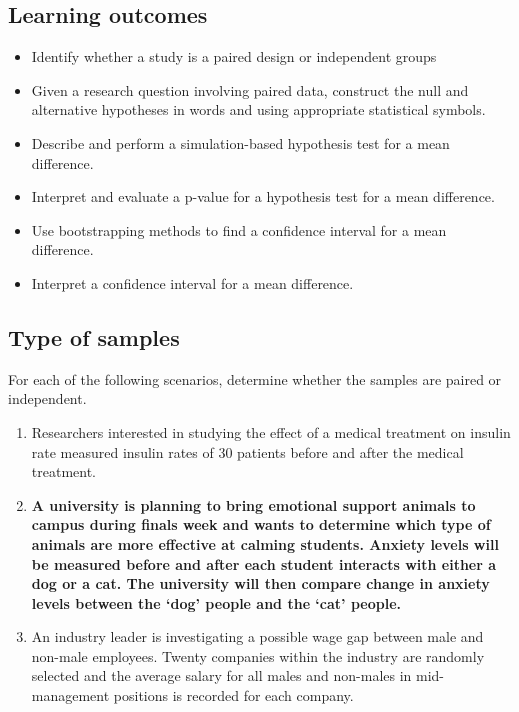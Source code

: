 \documentclass[
]{report}
\begin{document}

\hypertarget{learning-outcomes-5}{%
\subsection{Learning outcomes}\label{learning-outcomes-5}}

\begin{itemize}
\item
  Identify whether a study is a paired design or independent groups
\item
  Given a research question involving paired data, construct the null and alternative hypotheses
  in words and using appropriate statistical symbols.
\item
  Describe and perform a simulation-based hypothesis test for a mean difference.
\item
  Interpret and evaluate a p-value for a hypothesis test for a mean difference.
\item
  Use bootstrapping methods to find a confidence interval for a mean difference.
\item
  Interpret a confidence interval for a mean difference.
\end{itemize}

\hypertarget{type-of-samples}{%
\subsection{Type of samples}\label{type-of-samples}}

For each of the following scenarios, determine whether the samples are paired or independent.

\begin{enumerate}
\def\labelenumi{\arabic{enumi}.}
\item
  Researchers interested in studying the effect of a medical treatment on insulin rate measured insulin rates of 30 patients before and after the medical treatment.
  \vspace{0.3in}
\item
  \textbf{A university is planning to bring emotional support animals to campus during finals week and wants to determine which type of animals are more effective at calming students. Anxiety levels will be measured before and after each student interacts with either a dog or a cat. The university will then compare change in anxiety levels between the `dog' people and the `cat' people.}
  \vspace{0.3in}
\item
  An industry leader is investigating a possible wage gap between male and non-male employees. Twenty companies within the industry are randomly selected and the average salary for all males and non-males in mid-management positions is recorded for each company.
  \vspace{0.3in}
\end{enumerate}
\end{document}
